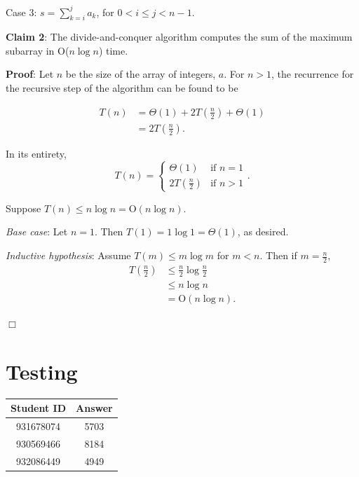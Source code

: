 \documentclass[a4paper,10pt]{article}
\begin{document}
		{\sc Case 3}: $\displaystyle s = \sum_{k=i}^j a_k$, for $0 < i \leq j < n-1$.




		{\bf Claim 2}: The divide-and-conquer algorithm computes the sum of the maximum subarray in O($n \log n$) time.

		{\bf Proof}: Let $n$ be the size of the array of integers, $a$. For $n>1$, the recurrence for the recursive step of the algorithm can be found to be

		\begin{align*}
		T(n) &= \Theta(1) + 2T\left(\frac{n}{2}\right) + \Theta(1) \\
		     &= 2T\left(\frac{n}{2}\right).
		\end{align*}

		In its entirety, \[T(n) = \begin{cases} \Theta(1) &\mbox{if } n = 1 \\ 2T\left(\frac{n}{2}\right) &\mbox{if } n > 1 \end{cases}.\]

		Suppose $T(n) \leq n \log n = \text{O}(n \log n)$.

		{\it Base case}: Let $n=1$. Then $T(1) = 1 \log 1 = \Theta(1)$, as desired.

		{\it Inductive hypothesis}: Assume $T(m) \leq m \log m$ for $m < n$. Then if $m = \frac{n}{2}$,
		\begin{align*}
		T\left(\frac{n}{2}\right) &\leq \frac{n}{2} \log \frac{n}{2} \\
		     &\leq n \log n \\
		     &= \text{O}(n \log n).
		\end{align*}

		\begin{center}
		$\Box$
		\end{center}


	\section{Testing}

		\begin{tabular}{ | c | c | }
		\hline
		Student ID & Answer\\ \hline
		931678074 & 5703 \\
		930569466 & 8184 \\
		932086449 & 4949 \\
		\hline
		\end{tabular}
\end{document}
